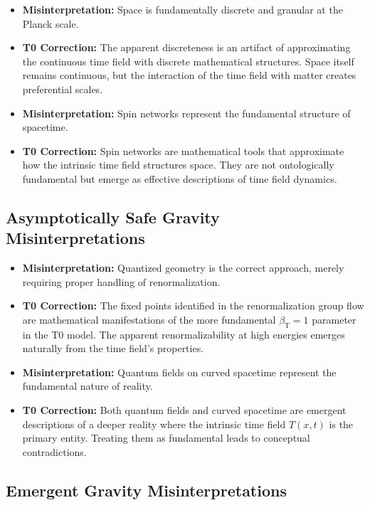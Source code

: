 \documentclass[12pt,a4paper]{article}
\newcommand{\Tfieldt}{T(x,t)}
\newcommand{\betaT}{\beta_{\text{T}}}
\begin{document}
	\begin{itemize}
		\item \textbf{Misinterpretation:} Space is fundamentally discrete and granular at the Planck scale.
		\item \textbf{T0 Correction:} The apparent discreteness is an artifact of approximating the continuous time field with discrete mathematical structures. Space itself remains continuous, but the interaction of the time field with matter creates preferential scales.
		
		\item \textbf{Misinterpretation:} Spin networks represent the fundamental structure of spacetime.
		\item \textbf{T0 Correction:} Spin networks are mathematical tools that approximate how the intrinsic time field structures space. They are not ontologically fundamental but emerge as effective descriptions of time field dynamics.
	\end{itemize}
	
	\subsection{Asymptotically Safe Gravity Misinterpretations}
	\label{subsec:asg_misinterpretations}
	
	\begin{itemize}
		\item \textbf{Misinterpretation:} Quantized geometry is the correct approach, merely requiring proper handling of renormalization.
		\item \textbf{T0 Correction:} The fixed points identified in the renormalization group flow are mathematical manifestations of the more fundamental $\betaT = 1$ parameter in the T0 model. The apparent renormalizability at high energies emerges naturally from the time field's properties.
		
		\item \textbf{Misinterpretation:} Quantum fields on curved spacetime represent the fundamental nature of reality.
		\item \textbf{T0 Correction:} Both quantum fields and curved spacetime are emergent descriptions of a deeper reality where the intrinsic time field $\Tfieldt$ is the primary entity. Treating them as fundamental leads to conceptual contradictions.
	\end{itemize}
	
	\subsection{Emergent Gravity Misinterpretations}
	\label{subsec:emergent_misinterpretations}
	
\end{document}

